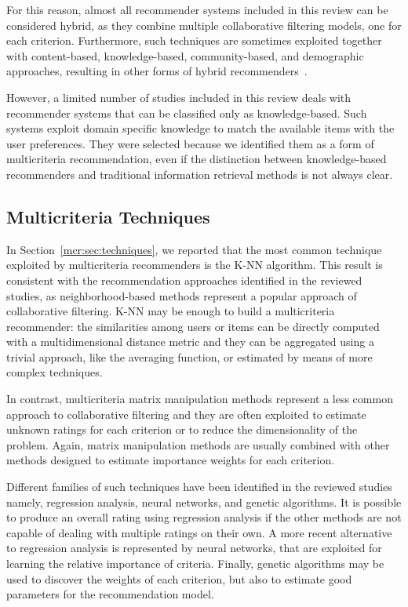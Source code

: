 For this reason, almost all recommender systems included in this review can be considered hybrid, as they combine multiple collaborative filtering models, one for each criterion. Furthermore, such techniques are sometimes exploited together with content-based, knowledge-based, community-based, and demographic approaches, resulting in other forms of hybrid recommenders~\cite{Burke2007}.

However, a limited number of studies included in this review deals with recommender systems that can be classified only as knowledge-based. Such systems exploit domain specific knowledge to match the available items with the user preferences. They were selected because we identified them as a form of multicriteria recommendation, even if the distinction between knowledge-based recommenders and traditional information retrieval methods is not always clear.

\subsection{Multicriteria Techniques}

In Section~\ref{mcr:sec:techniques}, we reported that the most common technique exploited by multicriteria recommenders is the K-NN algorithm. This result is consistent with the recommendation approaches identified in the reviewed studies, as neighborhood-based methods represent a popular approach of collaborative filtering. K-NN may be enough to build a multicriteria recommender: the similarities among users or items can be directly computed with a multidimensional distance metric and they can be aggregated using a trivial approach, like the averaging function, or estimated by means of more complex techniques.

In contrast, multicriteria matrix manipulation methods represent a less common approach to collaborative filtering and they are often exploited to estimate unknown ratings for each criterion or to reduce the dimensionality of the problem. Again, matrix manipulation methods are usually combined with other methods designed to estimate importance weights for each criterion.

Different families of such techniques have been identified in the reviewed studies namely, regression analysis, neural networks, and genetic algorithms. It is possible to produce an overall rating using regression analysis if the other methods are not capable of dealing with multiple ratings on their own. A more recent alternative to regression analysis is represented by neural networks, that are exploited for learning the relative importance of criteria. Finally, genetic algorithms may be used to discover the weights of each criterion, but also to estimate good parameters for the recommendation model.

